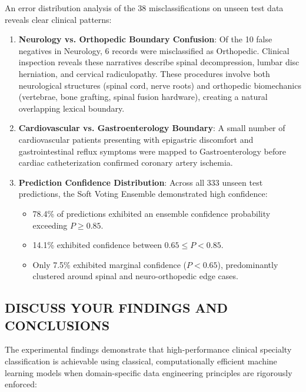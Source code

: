 An error distribution analysis of the 38 misclassifications on unseen test data reveals clear clinical patterns:
\begin{enumerate}
    \item \textbf{Neurology vs. Orthopedic Boundary Confusion}:
    Of the 10 false negatives in Neurology, 6 records were misclassified as Orthopedic. Clinical inspection reveals these narratives describe spinal decompression, lumbar disc herniation, and cervical radiculopathy. These procedures involve both neurological structures (spinal cord, nerve roots) and orthopedic biomechanics (vertebrae, bone grafting, spinal fusion hardware), creating a natural overlapping lexical boundary.
    \item \textbf{Cardiovascular vs. Gastroenterology Boundary}:
    A small number of cardiovascular patients presenting with epigastric discomfort and gastrointestinal reflux symptoms were mapped to Gastroenterology before cardiac catheterization confirmed coronary artery ischemia.
    \item \textbf{Prediction Confidence Distribution}:
    Across all 333 unseen test predictions, the Soft Voting Ensemble demonstrated high confidence:
    \begin{itemize}
        \item 78.4\% of predictions exhibited an ensemble confidence probability exceeding $P \ge 0.85$.
        \item 14.1\% exhibited confidence between $0.65 \le P < 0.85$.
        \item Only 7.5\% exhibited marginal confidence ($P < 0.65$), predominantly clustered around spinal and neuro-orthopedic edge cases.
    \end{itemize}
\end{enumerate}

\subsection{DISCUSS YOUR FINDINGS AND CONCLUSIONS}

The experimental findings demonstrate that high-performance clinical specialty classification is achievable using classical, computationally efficient machine learning models when domain-specific data engineering principles are rigorously enforced:

